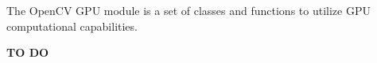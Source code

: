 The OpenCV GPU module is a set of classes and functions to utilize GPU computational capabilities.

\textbf{TO DO}